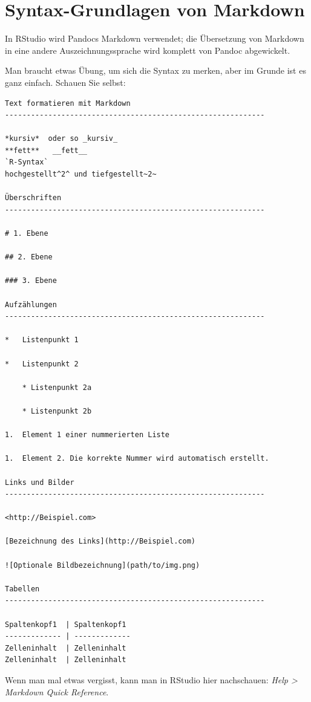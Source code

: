 \documentclass[12pt,]{book}
\begin{document}
\section{Syntax-Grundlagen von
Markdown}\label{syntax-grundlagen-von-markdown}

In RStudio wird Pandocs Markdown verwendet; die Übersetzung von Markdown
in eine andere Auszeichnungssprache wird komplett von Pandoc
abgewickelt.

Man braucht etwas Übung, um sich die Syntax zu merken, aber im Grunde
ist es ganz einfach. Schauen Sie selbst:

\begin{verbatim}
Text formatieren mit Markdown
------------------------------------------------------------

*kursiv*  oder so _kursiv_
**fett**   __fett__
`R-Syntax`
hochgestellt^2^ und tiefgestellt~2~

Überschriften
------------------------------------------------------------

# 1. Ebene

## 2. Ebene

### 3. Ebene

Aufzählungen
------------------------------------------------------------

*   Listenpunkt 1

*   Listenpunkt 2

    * Listenpunkt 2a

    * Listenpunkt 2b

1.  Element 1 einer nummerierten Liste

1.  Element 2. Die korrekte Nummer wird automatisch erstellt.

Links und Bilder
------------------------------------------------------------

<http://Beispiel.com>

[Bezeichnung des Links](http://Beispiel.com)

![Optionale Bildbezeichnung](path/to/img.png)

Tabellen 
------------------------------------------------------------

Spaltenkopf1  | Spaltenkopf1
------------- | -------------
Zelleninhalt  | Zelleninhalt
Zelleninhalt  | Zelleninhalt
\end{verbatim}

Wenn man mal etwas vergisst, kann man in RStudio hier nachschauen:
\emph{Help \textgreater{} Markdown Quick Reference}.
\end{document}

